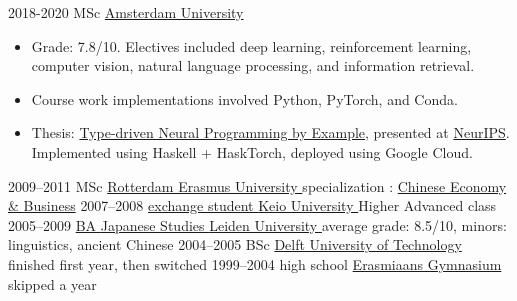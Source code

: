 \documentclass[]{friggeri-cv}
\begin{document}
\begin{entrylist}
  \entry
    {2018-2020}
    {MSc }
    {\href{http://www.uva.nl/}{
      Amsterdam University
    }}
    {
      \begin{itemize}
        \item Grade: 7.8/10. Electives included deep learning, reinforcement learning, computer vision, natural language processing, and information retrieval.
        \item Course work implementations involved Python, PyTorch, and Conda.
        \item Thesis: \href{https://arxiv.org/abs/2008.12613}{Type-driven Neural Programming by Example}, presented at \href{https://capworkshop.github.io/}{NeurIPS}.
        Implemented using Haskell + HaskTorch, deployed using Google Cloud.
      \end{itemize}
    }
  \entry
    {2009–2011}
    {MSc }
    {\href{https://www.rsm.nl/}{
      Rotterdam Erasmus University
    }}
    {
      specialization
      :
      \href{https://www.rsm.nl/about-rsm/organisation/expertise-search/chinese-economy/}{Chinese Economy \& Business}}
  \entry
    {2007–2008}
    {\href{https://www.cjs.keio.ac.jp/?page=24}{%
exchange student 
    }}
    {\href{https://www.keio.ac.jp/}{
      Keio University
    }}
    {
      Higher Advanced class
    }
  \entry
    {2005–2009}
    {\href{https://www.universiteitleiden.nl/onderwijs/opleidingen/bachelor/japanstudies}{BA \normalfont
    {
      Japanese Studies
    }}}
    {\href{https://www.universiteitleiden.nl/}{
      Leiden University
    }}
    {
      average grade: 8.5/10, minors: linguistics, ancient Chinese
    }
  \entry
    {2004–2005}
    {BSc \href{https://ocw.tudelft.nl/programs/bachelor/technische-informatica/}{}}
    {\href{https://www.tudelft.nl/}{
      Delft University of Technology
    }}
    {finished first year, then switched}
  \entry
    {1999–2004}
    {%
high school
      \href{https://nl.wikipedia.org/wiki/Profiel_natuur_en_techniek}{}}
    {\href{http://www.erasmiaans.nl/}{Erasmiaans Gymnasium}}
    {skipped a year}
\end{entrylist}
\end{document}
